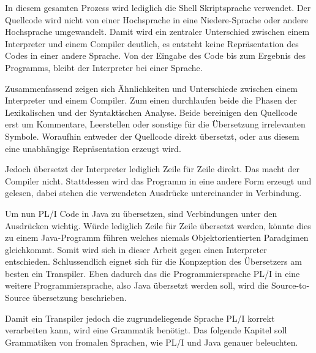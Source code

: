 In diesem gesamten Prozess wird lediglich die Shell Skriptsprache verwendet. Der Quellcode wird nicht von einer Hochsprache in eine Niedere-Sprache oder andere Hochsprache umgewandelt. Damit wird ein zentraler Unterschied zwischen einem Interpreter und einem Compiler deutlich, es entsteht keine Repräsentation des Codes in einer andere Sprache. Von der Eingabe des Code bis zum Ergebnis des Programms, bleibt der Interpreter bei einer Sprache.

Zusammenfassend zeigen sich Ähnlichkeiten und Unterschiede zwischen einem Interpreter und einem Compiler. Zum einen durchlaufen beide die Phasen der Lexikalischen und der Syntaktischen Analyse. 
Beide bereinigen den Quellcode erst um Kommentare, Leerstellen oder sonstige für die Übersetzung irrelevanten Symbole. Woraufhin entweder der Quellcode direkt übersetzt, oder aus diesem eine unabhängige Repräsentation erzeugt wird. 

Jedoch übersetzt der Interpreter lediglich Zeile für Zeile direkt. Das macht der Compiler nicht. Stattdessen wird das Programm in eine andere Form erzeugt und gelesen, dabei stehen die verwendeten Ausdrücke untereinander in Verbindung.

Um nun PL/I Code in Java zu übersetzen, sind Verbindungen unter den Ausdrücken wichtig. Würde lediglich Zeile für Zeile übersetzt werden, könnte dies zu einem Java-Programm führen welches niemals Objektorientierten Paradgimen gleichkommt. Somit wird sich in dieser Arbeit gegen einen Interpreter entschieden.
Schlussendlich eignet sich für die Konpzeption des Übersetzers am besten ein Transpiler. Eben dadurch das die Programmiersprache PL/I in eine weitere Programmiersprache, also Java übersetzt werden soll, wird die Source-to-Source übersetzung beschrieben. 

Damit ein Transpiler jedoch die zugrundeliegende Sprache PL/I korrekt verarbeiten kann, wird eine Grammatik benötigt. Das folgende Kapitel soll Grammatiken von fromalen Sprachen, wie PL/I und Java genauer beleuchten.


